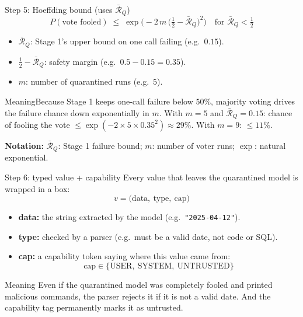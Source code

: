 \documentclass[aspectratio=169,11pt]{beamer}
\newcommand{\plain}[1]{\begin{block}{Meaning}#1\end{block}}
\providecommand{\notation}[1]{\par\vfill{\scriptsize\textcolor{gray!80!black}{\textbf{Notation:} #1}}}
\begin{document}
\begin{frame}{Step 5: Hoeffding bound \;(uses $\bar{\mathcal{R}}_Q$) \cite{hoeffding1963}}
  \[
    \boxed{\;
    P(\text{vote fooled}) \;\le\; \exp\Big(-2\,m\,\big(\tfrac{1}{2} - \bar{\mathcal{R}}_Q\big)^{\!2}\Big)
    \quad \text{for } \bar{\mathcal{R}}_Q < \tfrac{1}{2} \;}
  \]
  \small
  \begin{itemize}
    \item $\bar{\mathcal{R}}_Q$: Stage 1's upper bound on one call failing (e.g.\ $0.15$).
    \item $\frac{1}{2} - \bar{\mathcal{R}}_Q$: safety margin (e.g.\ $0.5 - 0.15 = 0.35$).
    \item $m$: number of quarantined runs (e.g.\ $5$).
  \end{itemize}
  \plain{Because Stage 1 keeps one-call failure below $50\%$, majority voting drives the failure chance down exponentially in $m$. With $m=5$ and $\bar{\mathcal{R}}_Q=0.15$: chance of fooling the vote $\le \exp(-2 \times 5 \times 0.35^2) \approx 29\%$. With $m=9$: $\le 11\%$.}
  \notation{$\bar{\mathcal{R}}_Q$: Stage 1 failure bound; $m$: number of voter runs; $\exp$: natural exponential.}
\end{frame}

\begin{frame}{Step 6: typed value + capability}
  Every value that leaves the quarantined model is wrapped in a box:
  \[
    v = \big(\text{data}, \ \text{type}, \ \text{cap}\big)
  \]
  \small
  \begin{itemize}
    \item \textbf{data:} the string extracted by the model (e.g.\ \texttt{"2025-04-12"}).
    \item \textbf{type:} checked by a parser (e.g.\ must be a valid date, not code or SQL).
    \item \textbf{cap:} a capability token saying where this value came from:
    \[
      \text{cap} \in \{\text{USER},\ \text{SYSTEM},\ \text{UNTRUSTED}\}
    \]
  \end{itemize}
  \begin{block}{Meaning}
    Even if the quarantined model was completely fooled and printed malicious commands, the parser rejects it if it is not a valid date. And the capability tag permanently marks it as untrusted.
  \end{block}
\end{frame}
\end{document}
